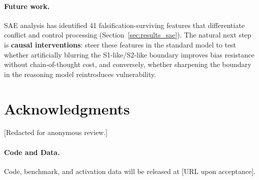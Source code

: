 \documentclass[accepted]{article}
\newcommand{\sone}{S1-like}
\newcommand{\stwo}{S2-like}
\begin{document}
\paragraph{Future work.}
SAE analysis has identified 41 falsification-surviving features that
differentiate conflict and control processing
(Section~\ref{sec:results_sae}).  The natural next step is
\textbf{causal interventions}: steer these features in the standard
model to test whether artificially blurring the \sone{}/\stwo{}
boundary improves bias resistance without chain-of-thought cost, and
conversely, whether sharpening the boundary in the reasoning model
reintroduces vulnerability.


\section*{Acknowledgments}

[Redacted for anonymous review.]

\paragraph{Code and Data.}
Code, benchmark, and activation data will be released at [URL upon
acceptance].




\end{document}
